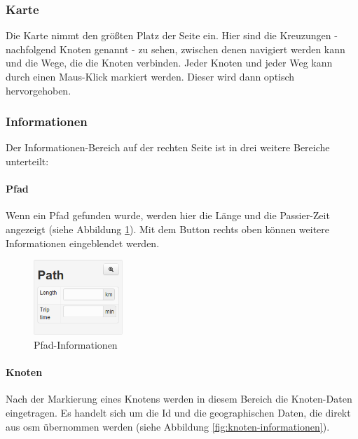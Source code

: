 \documentclass[a4paper,10pt]{scrreprt}
\begin{document}
\subsubsection{Karte}
\label{sec:karte}

Die Karte nimmt den größten Platz der Seite ein.
Hier sind die Kreuzungen - nachfolgend Knoten genannt - zu sehen, zwischen denen navigiert werden kann und die Wege, die die Knoten verbinden.
Jeder Knoten und jeder Weg kann durch einen Maus-Klick markiert werden.
Dieser wird dann optisch hervorgehoben.

\subsubsection{Informationen}
\label{sec:informationen}

Der Informationen-Bereich auf der rechten Seite ist in drei weitere Bereiche unterteilt:

\paragraph{Pfad}
\label{sec:pfad}

Wenn ein Pfad gefunden wurde, werden hier die Länge und die Passier-Zeit angezeigt (siehe Abbildung \ref{fig:pfad-informationen}).
Mit dem Button rechts oben können weitere Informationen eingeblendet werden.

\begin{figure}[htbp]
  \centering
  \includegraphics[width=0.3\textwidth]{Bilder/Pfad-Informationen.png}
  \caption{Pfad-Informationen}
  \label{fig:pfad-informationen}
\end{figure}

\paragraph{Knoten}
\label{sec:knoten}

Nach der Markierung eines Knotens werden in diesem Bereich die Knoten-Daten eingetragen.
Es handelt sich um die Id und die geographischen Daten, die direkt aus \gls{osm} übernommen werden (siehe Abbildung \ref{fig:knoten-informationen}).
\end{document}
